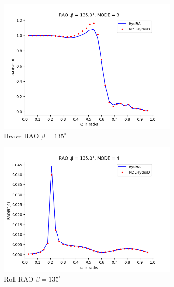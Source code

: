 \begin{figure}[H]
\begin{subfigure}[b]{0.45\textwidth}
        \includegraphics[width=\textwidth]{plots/kcs/rao2/rao3.png}
        \caption{Heave RAO $\beta = 135^{\circ}$}
    \end{subfigure}
    \begin{subfigure}[b]{0.45\textwidth}
        \includegraphics[width=\textwidth]{plots/kcs/rao2/rao4.png}
        \caption{Roll RAO $\beta = 135^{\circ}$}
    \end{subfigure}
    \vspace{5pt}%
    \begin{subfigure}[b]{0.45\textwidth}

\end{subfigure}
\end{figure}
